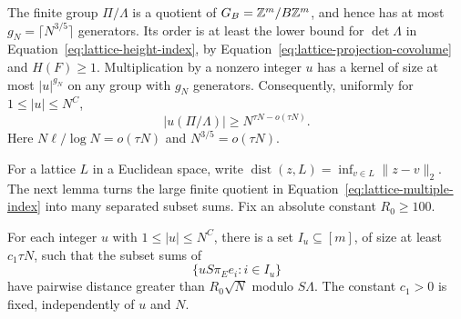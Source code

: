 The finite group $\Pi/\Lambda$ is a quotient of
$G_B=\mathbb Z^m/B\mathbb Z^m$, and hence has at most
$g_N=\lceil N^{3/5}\rceil$ generators.  Its order is at least the
lower bound for $\det\Lambda$ in
Equation~\eqref{eq:lattice-height-index}, by
Equation~\eqref{eq:lattice-projection-covolume} and $H(F)\ge1$.
Multiplication by a nonzero integer $u$ has a kernel of size at most
$|u|^{g_N}$ on any group with $g_N$ generators.  Consequently, uniformly
for $1\le |u|\le N^C$,
\begin{equation}\label{eq:lattice-multiple-index}
 |u(\Pi/\Lambda)|\ge N^{\tau N-o(\tau N)}.
\end{equation}
Here $N\ell/\log N=o(\tau N)$ and $N^{3/5}=o(\tau N)$.

For a lattice $L$ in a Euclidean space, write
$\operatorname{dist}(z,L)=\inf_{v\in L}\lVert z-v\rVert_2$.
The next lemma turns the large finite quotient in
Equation~\eqref{eq:lattice-multiple-index} into many separated subset
sums.  Fix an absolute constant $R_0\ge100$.

\begin{lemma}\label{lem:separated-subsets}
For each integer $u$ with $1\le |u|\le N^C$, there is a set
$I_u\subseteq[m]$, of size at least $c_1\tau N$, such that the subset
sums of
\[
 \{uS\pi_E e_i:i\in I_u\}
\]
have pairwise distance greater than $R_0\sqrt N$ modulo $S\Lambda$.
The constant $c_1>0$ is fixed, independently of $u$ and $N$.
\end{lemma}

